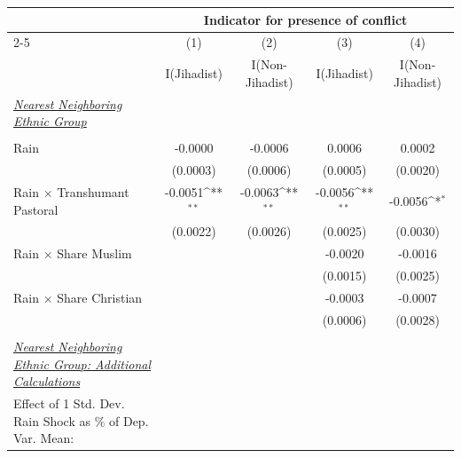 {
\def\sym#1{\ifmmode^{#1}\else\(^{#1}\)\fi}
\begin{tabular}{l*{4}{c}}
\toprule
                    &\multicolumn{4}{c}{Indicator for presence of conflict}         \\\cmidrule(lr){2-5}
                    &\multicolumn{1}{c}{(1)}&\multicolumn{1}{c}{(2)}&\multicolumn{1}{c}{(3)}&\multicolumn{1}{c}{(4)}\\
                    &\multicolumn{1}{c}{I(Jihadist)}&\multicolumn{1}{c}{I(Non-Jihadist)}&\multicolumn{1}{c}{I(Jihadist)}&\multicolumn{1}{c}{I(Non-Jihadist)}\\
\midrule
\underline{\emph{Nearest Neighboring Ethnic Group}} \vspace{-0.4cm}&               &               &               &               \\
                    &               &               &               &               \\
\addlinespace
\hspace{15pt} Rain  &-0.0000         &-0.0006         &0.0006         &0.0002         \\
                    &(0.0003)         &(0.0006)         &(0.0005)         &(0.0020)         \\
\addlinespace
\hspace{15pt} Rain $\times$ Transhumant Pastoral&-0.0051\sym{**} &-0.0063\sym{**} &-0.0056\sym{**} &-0.0056\sym{*}  \\
                    &(0.0022)         &(0.0026)         &(0.0025)         &(0.0030)         \\
\addlinespace
\hspace{15pt}  Rain $\times$ Share Muslim&               &               &-0.0020         &-0.0016         \\
                    &               &               &(0.0015)         &(0.0025)         \\
\addlinespace
\hspace{15pt}  Rain $\times$ Share Christian&               &               &-0.0003         &-0.0007         \\
                    &               &               &(0.0006)         &(0.0028)         \\
\midrule
\\ \underline{\emph{Nearest Neighboring Ethnic Group: Additional Calculations}} &               &               &               &               \\
[1em] Effect of 1 Std. Dev. Rain Shock as $\%$ of Dep. Var. Mean:&               &               &               &               \\

\end{tabular}}
